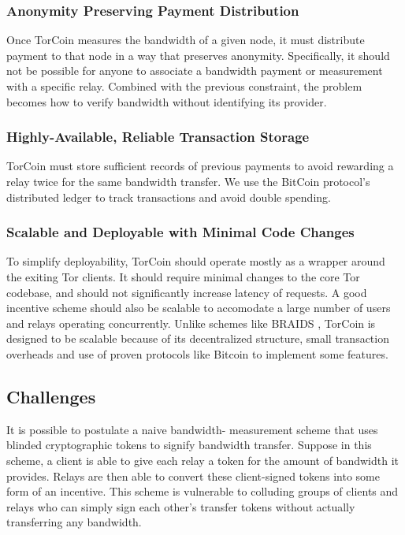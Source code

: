 \subsubsection{Anonymity Preserving Payment Distribution} Once TorCoin
measures the bandwidth of a given node, it must distribute payment to that
node in a way that preserves anonymity. Specifically, it should not be
possible for anyone to associate a bandwidth payment or measurement with a
specific relay. Combined with the previous constraint, the problem becomes how
to verify bandwidth without identifying its provider.

\subsubsection{Highly-Available, Reliable Transaction Storage} TorCoin must
store sufficient records of previous payments to avoid rewarding a relay twice
for the same bandwidth transfer. We use the BitCoin protocol's distributed
ledger  to track transactions and avoid double spending.

\subsubsection{Scalable and Deployable with Minimal Code Changes} To simplify
deployability, TorCoin should operate mostly as a wrapper around the exiting
Tor clients. It should require minimal changes to the core Tor codebase, and
should not significantly increase latency of requests. A good incentive scheme
should also be scalable to accomodate a large number of users and relays
operating concurrently. Unlike schemes like BRAIDS \cite{ccs10-braids},
TorCoin is designed to be scalable because of its decentralized structure,
small transaction overheads and use of proven protocols  like Bitcoin to
implement some features.

\subsection{Challenges} It is possible to postulate a naive bandwidth-
measurement scheme that uses blinded cryptographic tokens to signify bandwidth
transfer. Suppose in this scheme, a client is able to give each relay a token
for the amount of bandwidth it provides. Relays are then able to convert these
client-signed tokens into some form of an incentive. This scheme is vulnerable
to colluding groups of clients and relays who can simply sign each other's
transfer tokens without actually transferring any bandwidth.

